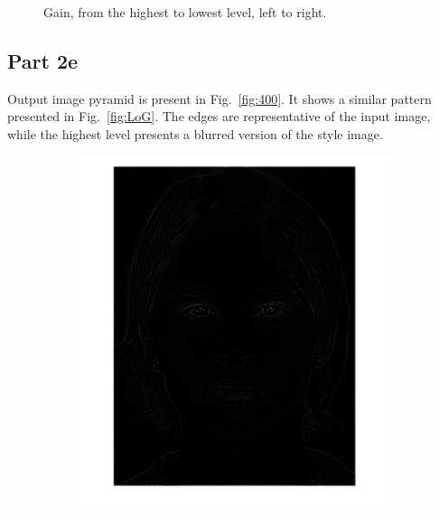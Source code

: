 \documentclass[a4paper]{iacas}
\begin{document}
\begin{figure}[!htbp]
	\caption{Gain, from the highest to lowest level, left to right.}
	\label{fig:200}
\end{figure}

\subsection{Part 2e}

Output image pyramid is present in Fig.~\ref{fig:400}. It shows a similar pattern presented in Fig.~\ref{fig:LoG}. The edges are representative of the input image, while the highest level presents a blurred version of the style image.

\begin{figure}[!htbp]
	
	\begin{subfigure}[b]{0.15\textwidth}
		\includegraphics[width=\textwidth]{401.jpg}
		\caption{}
		\label{fig:401}
	\end{subfigure}
	\begin{subfigure}[b]{0.15\textwidth}

\end{subfigure}
\end{figure}
\end{document}
